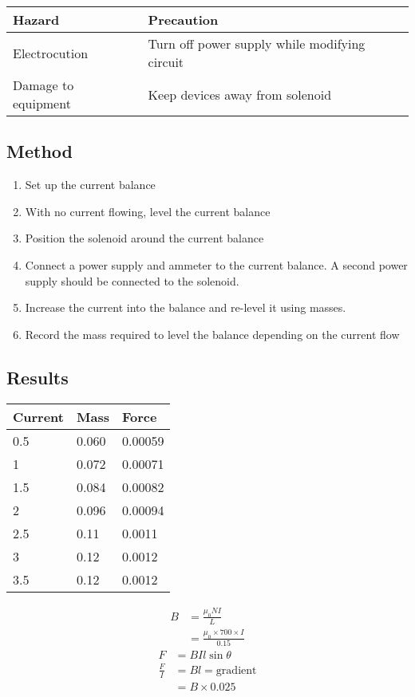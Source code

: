 		\begin{table}[htbp]
			\centering
			\begin{tabular}{l|l}
				Hazard			& Precaution \\ \hline
				Electrocution		& Turn off power supply while modifying circuit \\
				Damage to equipment	& Keep devices away from solenoid
			\end{tabular}
		\end{table}

	\subsection{Method}
		\begin{enumerate}
			\item Set up the current balance
			\item With no current flowing, level the current balance
			\item Position the solenoid around the current balance
			\item Connect a power supply and ammeter to the current balance. A second power supply should be connected to the solenoid.
			\item Increase the current into the balance and re-level it using masses.
			\item Record the mass required to level the balance depending on the current flow
		\end{enumerate}
	
	\subsection{Results}
		\begin{table}[htbp]
			\centering
			\begin{tabular}{l|l|l}
				Current	& Mass	& Force \\ \hline
				0.5 	& 0.060	& 0.00059	\\
				1	& 0.072	& 0.00071	\\
				1.5	& 0.084	& 0.00082	\\
				2	& 0.096	& 0.00094	\\
				2.5	& 0.11	& 0.0011	\\
				3	& 0.12	& 0.0012	\\
				3.5	& 0.12	& 0.0012
			\end{tabular}
		\end{table}

		\begin{align*}
			B &= \frac{\mu_0 N I}{L} \\
			  &= \frac{\mu_0 \times 700 \times I}{0.15}
		\end{align*}
		\begin{align*}
			F &= BIl \sin{\theta} \\
			\frac{F}{I} &= Bl = \text{gradient} \\
				    &= B \times 0.025
		\end{align*}

